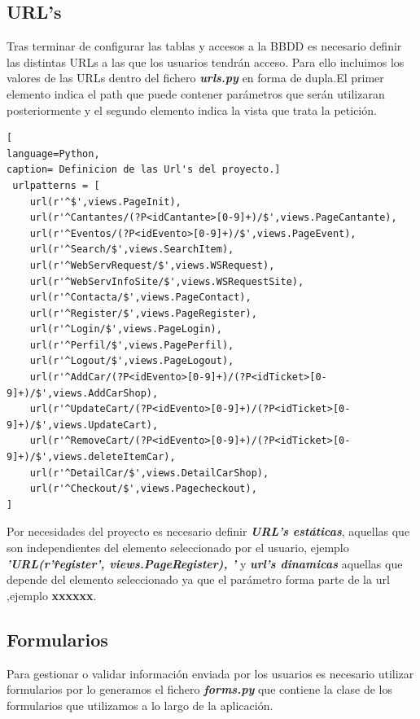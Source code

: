 \subsection{URL's}
Tras terminar de configurar las tablas y accesos a la BBDD es necesario definir las distintas URLs a las que los usuarios tendrán acceso. Para ello incluimos los valores de las URLs dentro del fichero\textit{ \textbf{urls.py}} en forma de dupla.El primer elemento indica el path que puede contener parámetros que serán utilizaran posteriormente y el segundo elemento indica la vista que trata la petición.
\begin{lstlisting}[
language=Python,
caption= Definicion de las Url's del proyecto.]
 urlpatterns = [
    url(r'^$',views.PageInit),
    url(r'^Cantantes/(?P<idCantante>[0-9]+)/$',views.PageCantante),
    url(r'^Eventos/(?P<idEvento>[0-9]+)/$',views.PageEvent),
    url(r'^Search/$',views.SearchItem),
    url(r'^WebServRequest/$',views.WSRequest),
    url(r'^WebServInfoSite/$',views.WSRequestSite),
    url(r'^Contacta/$',views.PageContact),
    url(r'^Register/$',views.PageRegister),
    url(r'^Login/$',views.PageLogin),
    url(r'^Perfil/$',views.PagePerfil),
    url(r'^Logout/$',views.PageLogout),
    url(r'^AddCar/(?P<idEvento>[0-9]+)/(?P<idTicket>[0-9]+)/$',views.AddCarShop),
    url(r'^UpdateCart/(?P<idEvento>[0-9]+)/(?P<idTicket>[0-9]+)/$',views.UpdateCart),
    url(r'^RemoveCart/(?P<idEvento>[0-9]+)/(?P<idTicket>[0-9]+)/$',views.deleteItemCar),
    url(r'^DetailCar/$',views.DetailCarShop),
    url(r'^Checkout/$',views.Pagecheckout),
]
\end{lstlisting}
Por necesidades del proyecto es necesario definir \textbf{\textit{URL's estáticas}}, aquellas que son independientes del elemento seleccionado por el usuario, ejemplo \textbf{\textit{'URL(r'\^register\/', views.PageRegister), '}} y \textbf{\textit{url's dinamicas}} aquellas que depende del elemento seleccionado ya que el parámetro forma parte de la url ,ejemplo \textbf{xxxxxx}.
\subsection{Formularios}
Para gestionar o validar información enviada por los usuarios es necesario utilizar formularios por lo generamos el fichero \textit{\textbf{forms.py}} que contiene la clase de los formularios que utilizamos a lo largo de la aplicación.
